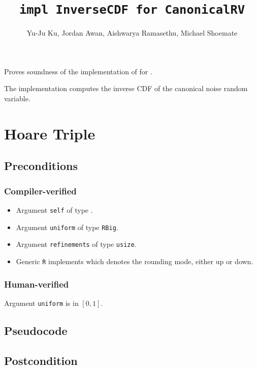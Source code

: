 \documentclass{article}
\title{\texttt{impl InverseCDF for CanonicalRV}}
\author{Yu-Ju Ku, Jordan Awan, Aishwarya Ramasethu, Michael Shoemate}
\begin{document}
\maketitle

Proves soundness of the implementation of  
for .

The implementation computes the inverse CDF of the canonical noise random variable.

\section{Hoare Triple}

\subsection*{Preconditions}
\subsubsection*{Compiler-verified}
\begin{itemize}
    \item Argument \texttt{self} of type .
    \item Argument \texttt{uniform} of type \texttt{RBig}.
    \item Argument \texttt{refinements} of type \texttt{usize}.
    \item Generic \texttt{R} implements  which denotes the rounding mode, either up or down.
\end{itemize}

\subsubsection*{Human-verified}
Argument \texttt{uniform} is in $[0, 1]$.

\subsection*{Pseudocode}



\subsection*{Postcondition}
\end{document}
